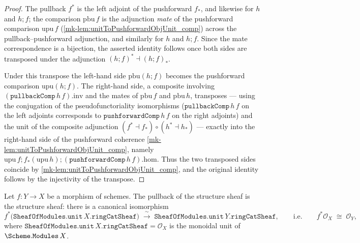 \begin{proof}
  \leanok
  The pullback \(f^*\) is the left adjoint of the pushforward \(f_*\), and likewise for
  \(h\) and \(h \mathbin{;} f\); the comparison \(\mathrm{pbu}\,f\) is the adjunction
  \emph{mate} of the pushforward comparison \(\mathrm{upu}\,f\)
  (\ref{mk-lem:unitToPushforwardObjUnit_comp}) across the pullback--pushforward adjunction,
  and similarly for \(h\) and \(h \mathbin{;} f\). Since the mate correspondence is a
  bijection, the asserted identity follows once both sides are transposed under the
  adjunction \((h \mathbin{;} f)^* \dashv (h \mathbin{;} f)_*\).

  Under this transpose the left-hand side \(\mathrm{pbu}(h \mathbin{;} f)\) becomes the
  pushforward comparison \(\mathrm{upu}(h \mathbin{;} f)\). The right-hand side, a
  composite involving \((\mathtt{pullbackComp}\,h\,f).\mathrm{inv}\) and the mates of
  \(\mathrm{pbu}\,f\) and \(\mathrm{pbu}\,h\), transposes --- using the conjugation of the
  pseudofunctoriality isomorphisms (\(\mathtt{pullbackComp}\,h\,f\) on the left adjoints
  corresponds to \(\mathtt{pushforwardComp}\,h\,f\) on the right adjoints) and the unit of
  the composite adjunction \((f^* \dashv f_*) \circ (h^* \dashv h_*)\) --- exactly into the
  right-hand side of the pushforward coherence
  \ref{mk-lem:unitToPushforwardObjUnit_comp}, namely
  \(\mathrm{upu}\,f \mathbin{;} f_*(\mathrm{upu}\,h) \mathbin{;}
  (\mathtt{pushforwardComp}\,h\,f).\mathrm{hom}\). Thus the two transposed sides coincide
  by \ref{mk-lem:unitToPushforwardObjUnit_comp}, and the original identity follows by the
  injectivity of the transpose.
\end{proof}

\begin{lemma}\label{mk-lem:pullback_unit_iso}
  \leanok

  Let \(f : Y \to X\) be a morphism of schemes. The pullback of the structure sheaf
  is the structure sheaf: there is a canonical isomorphism
  \[
    f^*\bigl(\mathtt{SheafOfModules.unit}\,X.\mathtt{ringCatSheaf}\bigr)
      \;\xrightarrow{\;\sim\;}\;
    \mathtt{SheafOfModules.unit}\,Y.\mathtt{ringCatSheaf},
    \qquad\text{i.e.}\qquad
    f^* \mathcal{O}_X \;\cong\; \mathcal{O}_Y,
  \]
  where \(\mathtt{SheafOfModules.unit}\,X.\mathtt{ringCatSheaf} = \mathcal{O}_X\) is
  the monoidal unit of \(\Scheme.\mathtt{Modules}\,X\).
\end{lemma}


